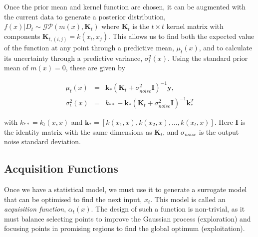 \documentclass[preprint]{elsarticle}
\begin{document}
Once the prior mean and kernel function are chosen, it can be augmented with the current data to generate a posterior distribution, $f(x)\vert D_{t}\sim\mathcal{GP}\left(m(x),\mathbf{K}_{t}\right)$
where $\mathbf{K}_t$ is the $t\times t$ kernel matrix with components $\mathbf{K}_{t,(i,j)}=k(x_i,x_j)$.
This allows us to find both the expected value of the function at any point through a predictive mean, $\mu_{t}(x)$, and to calculate its uncertainty through a predictive variance, $\sigma_{t}^{2}(x)$. Using the standard prior mean of $m(x)=0$, these are given by 
\begin{linenomath*}
\begin{eqnarray}
\mu_{t}(x)&=&\mathbf{k_{*}}(\mathbf{K}_{t}+\sigma^2_{noise}\mathbf{I})^{-1}\boldsymbol{y},\\\nonumber
\sigma_{t}^{2}(x)&=&k_{*\!*}-\mathbf{k_{*}}(\mathbf{K}_{t}+\sigma^2_{noise}\mathbf{I})^{\mathrm{-1}}\mathbf{k}_{*}^{\mathit{T}}
\end{eqnarray}
\end{linenomath*}
 with $k_{*\!*}=k_{t}(x,x)$ and $\mathbf{k}_{*}=[k(x_{1},x),k(x_{2},x),\ldots,k(x_{t},x)]$.
Here $\mathbf{I}$ is the identity matrix with the same dimensions
as $\mathbf{K}_{t}$, and $\sigma_{noise}$ is the output noise standard deviation. 

\subsection{Acquisition Functions\label{subsec:Acquisition-Functions}}

Once we have a statistical model, we must use it to generate a surrogate model that can be optimised to find the next input, $x_t$. This model is called an \emph{acquisition function}, $\alpha_t(x)$. The design of such a function is non-trivial, as it must balance selecting points to improve the Gaussian process (exploration) and focusing points in promising regions to find the global optimum (exploitation).
\end{document}
